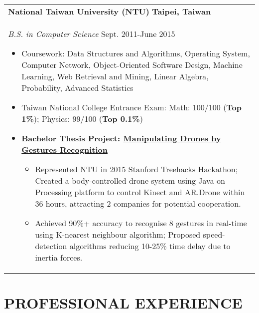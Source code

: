 \documentclass[a4paper,10pt]{article} %
\begin{document}
{\begin{tabular}{p{18.5cm}}
{\fontsize{11}{13.2}\textbf{National Taiwan University (NTU)}} \hfill \textbf{Taipei, Taiwan}\\
{\it B.S. in Computer Science} \hfill Sept. 2011-June 2015
\begin{itemize}
\item Coursework: Data Structures and Algorithms, Operating System, Computer Network, Object-Oriented Software Design, Machine Learning, Web Retrieval and Mining, Linear Algebra, Probability, Advanced Statistics 
\item Taiwan National College Entrance Exam:  Math: 100/100 (\textbf{Top 1\%}); Physics: 99/100 (\textbf{Top 0.1\%})
\item \textbf {Bachelor Thesis Project: {\href{https://www.youtube.com/watch?v=jxsZaQ6PcXU}{Manipulating Drones by Gestures Recognition}}}
\begin{itemize}
	\item Represented NTU in 2015 Stanford Treehacks Hackathon; Created a body-controlled drone system using Java on Processing platform to control Kinect and AR.Drone within 36 hours, attracting 2 companies for potential cooperation. 
	\item Achieved 90\%+ accuracy to recognise 8 gestures in real-time using K-nearest neighbour algorithm; Proposed speed-detection algorithms reducing 10-25\% time delay due to inertia forces. \vspace*{-\baselineskip}
\end{itemize}
\end{itemize} 
\end{tabular}

\section{\textbf{PROFESSIONAL EXPERIENCE}}
\begin{tabular}{p{18.5cm}}


\end{tabular}}
\end{document}
